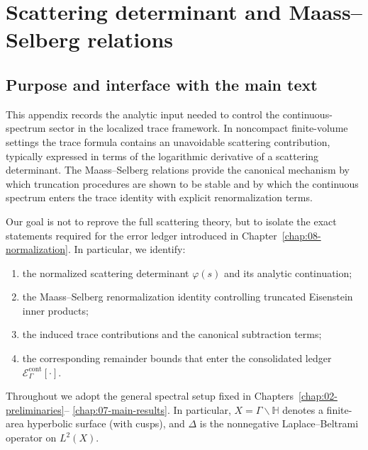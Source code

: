 
\appendix
\chapter{Scattering determinant and Maass--Selberg relations}
\label{app:K.scattering}

\section{Purpose and interface with the main text}
\label{sec:K.purpose}

This appendix records the analytic input needed to control the continuous-spectrum sector in the localized trace
framework.  In noncompact finite-volume settings the trace formula contains an unavoidable scattering contribution,
typically expressed in terms of the logarithmic derivative of a scattering determinant.  The Maass--Selberg relations
provide the canonical mechanism by which truncation procedures are shown to be stable and by which the continuous
spectrum enters the trace identity with explicit renormalization terms.

Our goal is not to reprove the full scattering theory, but to isolate the exact statements required for the error
ledger introduced in Chapter~\ref{chap:08-normalization}.  In particular, we identify:

\begin{enumerate}
\item the normalized scattering determinant $\varphi(s)$ and its analytic continuation;
\item the Maass--Selberg renormalization identity controlling truncated Eisenstein inner products;
\item the induced trace contributions and the canonical subtraction terms;
\item the corresponding remainder bounds that enter the consolidated ledger
$\mathcal{E}_\Gamma^{\mathrm{cont}}[\cdot]$.
\end{enumerate}

Throughout we adopt the general spectral setup fixed in Chapters~\ref{chap:02-preliminaries}--%
\ref{chap:07-main-results}.  In particular, $X=\Gamma\backslash\mathbb{H}$ denotes a finite-area hyperbolic surface
(with cusps), and $\Delta$ is the nonnegative Laplace--Beltrami operator on $L^2(X)$.

